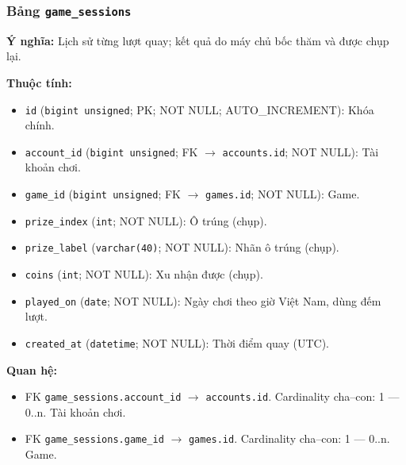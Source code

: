 \subsubsection{Bảng \texttt{game\_sessions}}

\textbf{Ý nghĩa:} Lịch sử từng lượt quay; kết quả do máy chủ bốc thăm và được chụp lại.\par

\textbf{Thuộc tính:}

\begin{itemize}

\item \texttt{id} (\texttt{bigint unsigned}; PK; NOT NULL; AUTO_INCREMENT): Khóa chính.

\item \texttt{account\_id} (\texttt{bigint unsigned}; FK $\rightarrow$ \texttt{accounts.id}; NOT NULL): Tài khoản chơi.

\item \texttt{game\_id} (\texttt{bigint unsigned}; FK $\rightarrow$ \texttt{games.id}; NOT NULL): Game.

\item \texttt{prize\_index} (\texttt{int}; NOT NULL): Ô trúng (chụp).

\item \texttt{prize\_label} (\texttt{varchar(40)}; NOT NULL): Nhãn ô trúng (chụp).

\item \texttt{coins} (\texttt{int}; NOT NULL): Xu nhận được (chụp).

\item \texttt{played\_on} (\texttt{date}; NOT NULL): Ngày chơi theo giờ Việt Nam, dùng đếm lượt.

\item \texttt{created\_at} (\texttt{datetime}; NOT NULL): Thời điểm quay (UTC).

\end{itemize}

\textbf{Quan hệ:}

\begin{itemize}

\item FK \texttt{game\_sessions.account\_id} $\rightarrow$ \texttt{accounts.id}. Cardinality cha--con: 1 — 0..n. Tài khoản chơi.

\item FK \texttt{game\_sessions.game\_id} $\rightarrow$ \texttt{games.id}. Cardinality cha--con: 1 — 0..n. Game.

\end{itemize}

